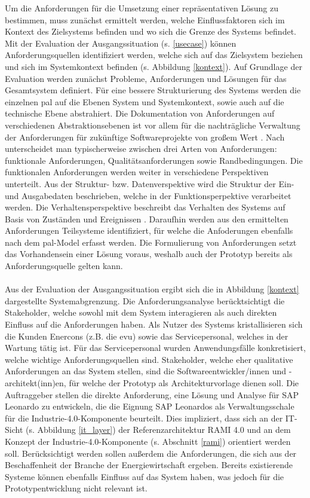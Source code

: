 Um die Anforderungen für die Umsetzung einer repräsentativen Lösung zu bestimmen, muss zunächst ermittelt werden, welche Einflussfaktoren sich im Kontext des Zielsystems befinden und wo sich die Grenze des Systems befindet. Mit der Evaluation der Ausgangssituation (s. \ref{usecase}) können Anforderungsquellen identifiziert werden, welche sich auf das Zielsystem beziehen und sich im Systemkontext befinden (s. Abbildung \ref{kontext}). Auf Grundlage der Evaluation werden zunächst Probleme, Anforderungen und Lösungen für das Gesamtsystem definiert. Für eine bessere Strukturierung des Systems werden die einzelnen \ac{pal} auf die Ebenen System und Systemkontext, sowie auch auf die technische Ebene abstrahiert. Die Dokumentation von Anforderungen auf verschiedenen Abstraktionsebenen ist vor allem für die nachträgliche Verwaltung der Anforderungen für zukünftige Softwareprojekte von großem Wert \citep{Lauenroth2016}. Nach \citet{IREB2017} unterscheidet man typischerweise zwischen drei Arten von Anforderungen: funktionale Anforderungen, Qualitätsanforderungen sowie Randbedingungen. Die funktionalen Anforderungen werden weiter in verschiedene Perspektiven unterteilt. Aus der Struktur- bzw. Datenverspektive wird die Struktur der Ein- und Ausgabedaten beschrieben, welche in der Funktionsperpektive verarbeitet werden. Die Verhaltensperspektive beschreibt das Verhalten des Systems auf Basis von Zuständen und Ereignissen \citep{Lauenroth2016}.
Daraufhin werden aus den ermittelten Anforderungen Teilsysteme identifiziert, für welche die Anfoderungen ebenfalls nach dem \ac{pal}-Model erfasst werden. Die Formulierung von Anforderungen setzt das Vorhandensein einer Lösung voraus, weshalb auch der Prototyp bereits als Anforderungsquelle gelten kann.
\\\\Aus der Evaluation der Ausgangssituation ergibt sich die in Abbildung \ref{kontext} dargestellte Systemabgrenzung. Die Anforderungsanalyse berücktsichtigt die Stakeholder, welche sowohl mit dem System interagieren als auch direkten Einfluss auf die Anforderungen haben. Als Nutzer des Systems kristallisieren sich die Kunden Enercons (z.B. die \ac{evu}) sowie das Servicepersonal, welches in der Wartung tätig ist. Für das Servicepersonal wurden Anwendungsfälle konkretisiert, welche wichtige Anforderungsquellen sind. Stakeholder, welche eher qualitative Anforderungen an das System stellen, sind die Softwareentwickler/innen und -architekt(inn)en, für welche der Prototyp als Architekturvorlage dienen soll. Die Auftraggeber stellen die direkte Anforderung, eine Lösung und Analyse für SAP Leonardo zu entwickeln, die die Eignung SAP Leonardos als Verwaltungsschale für die Industrie-4.0-Komponente beurteilt. Dies impliziert, dass sich an der IT-Sicht (s. Abbildung \ref{it_layer}) der Referenzarchitektur RAMI 4.0 und an dem Konzept der Industrie-4.0-Komponente (s. Abschnitt \ref{rami}) orientiert werden soll. Berücksichtigt werden sollen außerdem die Anforderungen, die sich aus der Beschaffenheit der Branche der Energiewirtschaft ergeben. Bereits existierende Systeme können ebenfalls Einfluss auf das System haben, was jedoch für die Prototypentwicklung nicht relevant ist.


